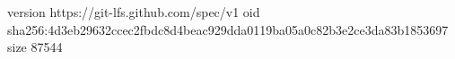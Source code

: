 version https://git-lfs.github.com/spec/v1
oid sha256:4d3eb29632ccec2fbdc8d4beac929dda0119ba05a0c82b3e2ce3da83b1853697
size 87544
